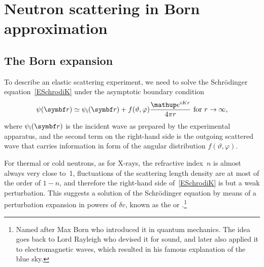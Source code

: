 %
%

\section{Neutron scattering in Born approximation}\label{SBornApprox}

\subsection{The Born expansion}\label{SBornExpans}

%

To describe an elastic scattering experiment,
we need to solve the Schrödinger equation~\cref{ESchrodiK}
under the asymptotic boundary condition
%
\begin{equation}\label{Escabouco}
  \psi(\r)
  \simeq \psi_\ti(\r) + f(\vartheta,\varphi)\frac{\e^{iKr}}{4\pi r}
  \text{~for~}r\to\infty,
\end{equation}
%
%
%
where $\psi_\ti(\r)$ is the incident wave
as prepared by the experimental apparatus,
and the second term on the right-hand side is
the outgoing scattered wave
that carries information in form of the angular distribution
$f(\vartheta,\varphi)$.

For thermal or cold neutrons, as for X-rays,
the refractive index~$n$ is almost always very close to~1,
fluctuations of the scattering length density are at most of the order of $1-n$,
and therefore the right-hand side of~\cref{ESchrodiK}
is but a weak perturbation.
This suggests a solution of the Schrödinger equation
by means of a perturbation expansion in powers of $\delta v$,
known as the  or .\footnote{
Named after Max Born
who introduced it in quantum mechanics.
The idea goes back to Lord Rayleigh
who devised it for sound,
and later also applied it to electromagnetic waves,
which resulted in his famous explanation of the blue sky.}

